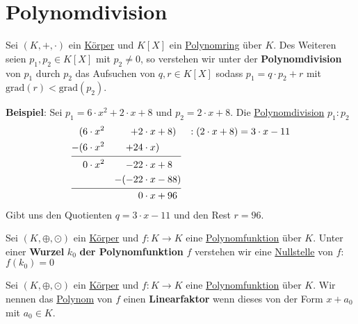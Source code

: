 \documentclass[../../main.tex]{subfiles}
\begin{document}
		\section{Polynomdivision}
		
		
		\begin{definition}[Polynomdivision]
			\label{def:Polynomdivision}
			Sei $(K,+,\cdot)$ ein \hyperref[def:Körper]{Körper} und $K[X]$ ein \hyperref[def:Polynomring]{Polynomring} über $K$. Des Weiteren seien $p_1,p_2 \in K[X]$ mit $p_2 \not = 0$, so verstehen wir unter der \textbf{Polynomdivision} von $p_1$ durch $p_2$ das Aufsuchen von $q,r \in K[X]$ sodass $p_1 = q \cdot p_2 + r$ mit $\textrm{grad}(r) < \textrm{grad}(p_2)$.
		\end{definition}
	
		\textbf{Beispiel}: Sei $p_1 = 6 \cdot x^2 + 2 \cdot x + 8$ und $p_2 = 2 \cdot x + 8$. Die \hyperref[def:Polynomdivision]{Polynomdivision} $p_1:p_2$
		\begin{alignat*}{5}
			( &6 \cdot x^2  &+  2 \cdot x &+ 8)              & :(2\cdot x + 8) = 3 \cdot x - 11 \\
			-(&6\cdot x^2   &+  24\cdot x &)  \\[-2ex]
			\cline{1-4} \\[-4.5ex]
			  &0\cdot x^2   &-  22 \cdot x &+ 8 \\	
			  &             &-(-22 \cdot x &- 88) \\[-2ex]
			\cline{1-4} \\[-4.5ex]
			  &             &    0 \cdot x &+ 96 
		\end{alignat*}
		Gibt uns den Quotienten $q = 3 \cdot x - 11$ und den Rest $r=96$.
		
		\begin{definition}
			\label{def:Wurzel}
			Sei $(K,\oplus, \odot)$ ein \hyperref[def:Körper]{Körper} und $f:K\rightarrow K$ eine \hyperref[def:Polynomfunktion]{Polynomfunktion} über $K$. Unter einer \textbf{Wurzel} $k_0$ \textbf{der Polynomfunktion} $f$ verstehen wir eine \hyperref[def:Nullstelle]{Nullstelle} von $f$: $f(k_0)=0$
		\end{definition}
		
		\begin{definition}[Linearfaktor]
			\label{def:Linearfaktor}
			Sei $(K,\oplus, \odot)$ ein \hyperref[def:Körper]{Körper} und $f:K\rightarrow K$ eine \hyperref[def:Polynomfunktion]{Polynomfunktion} über $K$. Wir nennen das \hyperref[def:Polynom]{Polynom} von $f$ einen \textbf{Linearfaktor} wenn dieses von der Form $x + a_0$ mit $a_0 \in K$.
		\end{definition}
		
\end{document}
